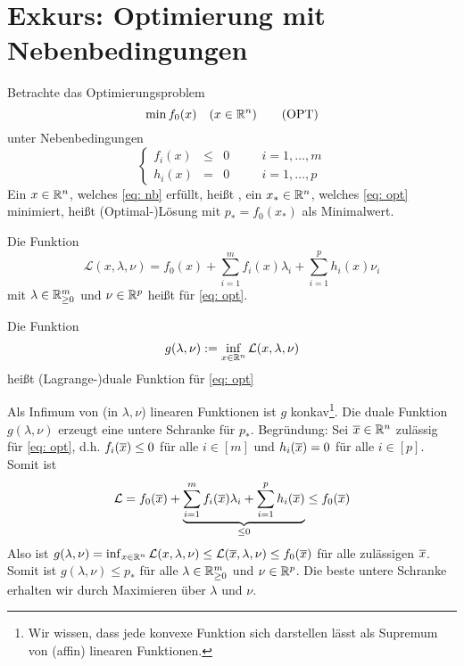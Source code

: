 \section{Exkurs: Optimierung mit Nebenbedingungen}

Betrachte das Optimierungsproblem
\begin{equation*}
	\min f_0(x) \quad (x \in \mathbb{R}^n)
	\tag{OPT} \label{eq: opt}
\end{equation*}
unter Nebenbedingungen
\begin{equation*}
	\left\{ \begin{array}{rclcl}
	f_i(x) &\le& 0 & \quad & i = 1, \dots, m \\
	h_i(x) &=& 0 & \quad & i = 1, \dots, p
	\end{array} \right.
	\tag{NB} \label{eq: nb}
\end{equation*}
Ein $x \in \mathbb{R}^n$, welches \eqref{eq: nb} erfüllt, heißt , ein $x_\ast \in \mathbb{R}^n$, welches \eqref{eq: opt} minimiert, heißt (Optimal-)Lösung mit $p_\ast = f_0(x_\ast)$ als Minimalwert.

\begin{*definition}
	Die Funktion 
	\begin{equation*}
		\mathcal{L}(x,\lambda, \nu) = f_0(x) + \sum_{i=1}^m f_i(x) \lambda_i + \sum_{i=1}^p h_i(x) \nu_i
	\end{equation*}
	mit $\lambda \in \mathbb{R}^m_{\ge 0}$ und $\nu \in \mathbb{R}^p$ heißt  für \eqref{eq: opt}.
	
	Die Funktion
	\begin{equation*}
		g(\lambda, \nu) \mathrel{:=} \inf_{x \in \mathbb{R}^n} \mathcal{L}(x,\lambda,\nu)
	\end{equation*}
	heißt (Lagrange-)duale Funktion für \eqref{eq: opt}
\end{*definition}

\begin{*bemerkung_inline}
	Als Infimum von (in $\lambda, \nu$) linearen Funktionen ist $g$ konkav\footnote{Wir wissen, dass jede konvexe Funktion sich darstellen lässt als Supremum von (affin) linearen Funktionen.}. Die duale Funktion $g(\lambda, \nu)$ erzeugt eine untere Schranke für $p_\ast$. Begründung: Sei $\overline{x} \in \mathbb{R}^n$ zulässig für \eqref{eq: opt}, d.h. $f_i(\overline{x}) \le 0$ für alle $i \in [m]$ und $h_i(\overline{x}) = 0$ für alle $i \in [p]$.  Somit ist
	\begin{equation*}
		\mathcal{L} = f_0(\overline{x}) + \underbrace{\sum_{i=1}^m f_i(\overline{x}) \lambda_i + \sum_{i=1}^p h_i(\overline{x})}_{\le 0} \le f_0(\overline{x})
	\end{equation*}
	Also ist $g(\lambda, \nu) = \inf_{x \in \mathbb{R}^n} \mathcal{L}(x,\lambda,\nu) \le \mathcal{L}(\overline{x}, \lambda, \nu) \le f_0(\overline{x})$ für alle zulässigen $\overline{x}$. Somit ist $g(\lambda, \nu) \le p_\ast$ für alle $\lambda \in \mathbb{R}^m_{\ge 0}$ und $\nu \in \mathbb{R}^p$. Die beste untere Schranke erhalten wir durch Maximieren über $\lambda$ und $\nu$.
\end{*bemerkung_inline}

